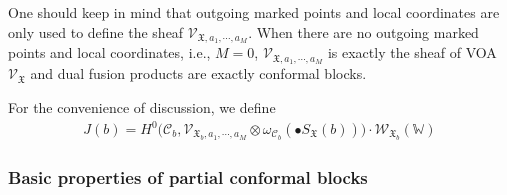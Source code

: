 \documentclass[11pt,b5paper,notitlepage]{article}
\theoremstyle{definition}
\theoremstyle{plain}
\newcommand{\SV}{\mathscr{V}}
\newcommand{\blt}{\bullet}
\newcommand{\Wbb}{\mathbb W}
\newcommand{\<}{\left\langle}
\renewcommand{\>}{\right\rangle}
\newcommand{\MC}{\mathcal{C}}
\newcommand{\fx}{\mathfrak{X}}
\newcommand{\SW}{\mathscr{W}}
\numberwithin{equation}{section}
\begin{document}
 
One should keep in mind that outgoing marked points and local coordinates are only used to define the sheaf $\SV_{\fx,a_1,\cdots,a_M}$. When there are no outgoing marked points and local coordinates, i.e., $M=0$, $\SV_{\fx,a_1,\cdots,a_M}$ is exactly the sheaf of VOA $\SV_\fx$ and dual fusion products are exactly conformal blocks.

For the convenience of discussion, we define 
\begin{gather}\label{eq21}
J(b)=H^0\big(\MC_b,\SV_{\fx_b,a_1,\cdots,a_M}\otimes \omega_{\MC_b}(\blt S_\fx(b))\big)\cdot \SW_{\fx_b}(\Wbb)
\end{gather}
 

\subsubsection{Basic properties of partial conformal blocks}

 
\end{document}

